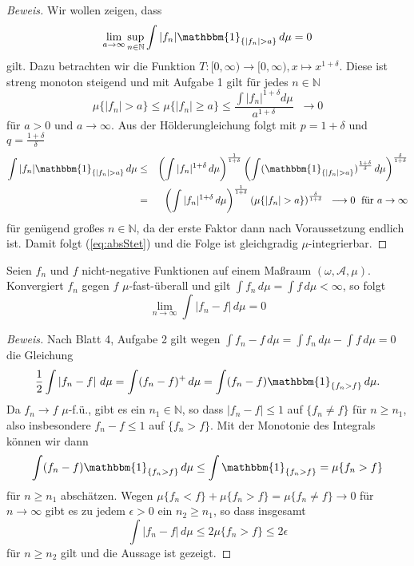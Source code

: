 \documentclass[10pt]{article}
\newenvironment{Aufgabe}[2][Aufgabe]{\begin{trivlist}
\item[\hskip \labelsep {\bfseries #1}\hskip \labelsep {\bfseries #2.}]}{\end{trivlist}}
\begin{document}
\begin{proof}[Beweis]
Wir wollen zeigen, dass 
\begin{equation}
\label{eq:absStet}
\lim_{a \rightarrow \infty} \sup_{n \in \mathbb{N}} \int |f_n| \mathbbm{1}_{\{|f_n| > a\}}  \, d\mu = 0
\end{equation}
gilt. Dazu betrachten wir die Funktion $T: [0, \infty) \rightarrow [0, \infty), x \mapsto x^{1+\delta}$. Diese ist streng monoton steigend und mit Aufgabe 1 gilt für jedes $n \in \mathbb{N}$
$$
\mu\{|f_n| > a\} \leq \mu\{|f_n| \geq a\} \leq \frac{\int |f_n|^{1+\delta } d\mu }{a^{1+\delta}} \;\; \longrightarrow 0
$$
für $a > 0$ und $a \rightarrow \infty$.
Aus der Hölderungleichung folgt mit $p = 1+\delta$ und $q = \frac{1+\delta}{\delta}$ 
\begin{eqnarray*}
\int |f_n |\mathbbm{1}_{\{|f_n| > a\}} \, d\mu &\leq&  \left( \int |f_n|^{1+\delta} \, d\mu \right)^{\frac{1}{1+\delta}} \left( \int (\mathbbm{1}_{\{|f_n| > a\}})^{\frac{1+\delta}{\delta}} \, d\mu \right)^{\frac{\delta}{1+\delta}} \\
						      &=& \left( \int |f_n|^{1+\delta} \, d\mu \right)^{\frac{1}{1+\delta}} \left( \mu\{|f_n| > a\} \right)^{\frac{\delta}{1+\delta}}  \;\;  \longrightarrow 0 \; \text{ für } a \rightarrow \infty
\end{eqnarray*}
für genügend großes $n \in \mathbb{N}$, da der erste Faktor dann nach Voraussetzung endlich ist. Damit folgt (\ref{eq:absStet}) und  die Folge ist gleichgradig $\mu$-integrierbar. 
\end{proof}


\begin{Aufgabe}{3} %
Seien $f_n$ und $f$ nicht-negative Funktionen auf einem Maßraum $(\omega, \mathcal{A}, \mu)$. Konvergiert $f_n$ gegen $f$ $\mu$-fast-überall und gilt $\int f_n \, d\mu = \int f \, d\mu < \infty$, so folgt
$$
\lim_{n \rightarrow \infty} \int \left| f_n - f\right| \, d\mu = 0
$$
\end{Aufgabe}

\begin{proof}[Beweis]
Nach Blatt 4, Aufgabe 2 gilt wegen $\int f_n-f \, d\mu = \int f_n \, d\mu - \int f \, d\mu  = 0$ die Gleichung 
$$
\frac{1}{2} \int \left| f_n - f\right| \, d\mu  = \int (f_n - f)^+ \, d\mu = \int (f_n-f) \mathbbm{1}_{\{f_n > f\}} \, d\mu.
$$
Da $f_n \rightarrow f$ $\mu$-f.ü., gibt es ein $n_1 \in \mathbb{N}$, so dass $|f_n-f| \leq 1$ auf $\{f_n \neq f\}$ für $n \geq n_1$, also insbesondere $f_n-f \leq 1$ auf $\{f_n > f\}$. Mit der Monotonie des Integrals können wir dann
$$
 \int (f_n-f) \mathbbm{1}_{\{f_n > f\}} \, d\mu \leq \int  \mathbbm{1}_{\{f_n > f\}} =  \mu\{f_n > f\}
$$
für $n \geq n_1$ abschätzen. Wegen $\mu\{f_n < f\} + \mu\{f_n > f\} = \mu\{f_n \neq f\} \rightarrow 0$ für $n \rightarrow \infty$ gibt es zu jedem $\epsilon > 0$ ein $n_2 \geq n_1$, so dass insgesamt
$$
\int \left| f_n - f\right| \, d\mu \leq 2  \mu\{f_n > f\} \leq 2 \epsilon
$$
für $n \geq n_2$ gilt und die Aussage ist gezeigt.
\end{proof}
\end{document}

